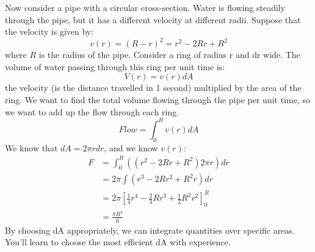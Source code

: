 Now consider a pipe with a circular cross-section. Water is flowing steadily through the pipe, but it has a different velocity at different radii. Suppose that the velocity is given by:
\begin{equation}
  v(r) = (R-r)^2 = r^2 - 2Rr + R^2
\end{equation}
where $R$ is the radius of the pipe.
Consider a ring of radius r and dr wide. The volume of water passing through this ring per unit time is:
\begin{equation}
  V(r) = v(r)dA
\end{equation}
the velocity (is the distance travelled in 1 second) multiplied by the area of the ring.
We want to find the total volume flowing through the pipe per unit time, so we want to add up the flow through each ring.
\begin{equation}
  Flow = \int_0^R v(r)dA
\end{equation}
We know that $dA = 2\pi r dr$, and we know $v(r)$:
\begin{align}
  F & = \int_0^R ((r^2 - 2Rr + R^2)2\pi r) dr                                             \\
    & = 2\pi \int (r^3 - 2Rr^2 + R^2r) dr                                                 \\
    & = 2\pi \left[ \frac{1}{4} r^4 - \frac{2}{3} R r^3 + \frac{1}{2} R^2 r^2 \right]^R_0 \\
    & = \frac{\pi R^4}{6}
\end{align}
By choosing dA appropriately, we can integrate quantities over specific areas. You’ll learn to choose the most efficient dA with experience.